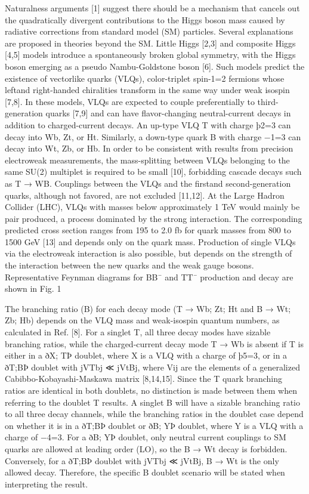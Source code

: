 Naturalness arguments [1] suggest there
should be a mechanism that cancels out the quadratically
divergent contributions to the Higgs boson mass caused by
radiative corrections from standard model (SM) particles.
Several explanations are proposed in theories beyond the
SM. Little Higgs [2,3] and composite Higgs [4,5] models
introduce a spontaneously broken global symmetry, with
the Higgs boson emerging as a pseudo Nambu-Goldstone
boson [6]. Such models predict the existence of vectorlike
quarks (VLQs), color-triplet spin-1=2 fermions whose leftand right-handed chiralities transform in the same way
under weak isospin [7,8]. In these models, VLQs are
expected to couple preferentially to third-generation quarks
[7,9] and can have flavor-changing neutral-current decays
in addition to charged-current decays. An up-type VLQ T
with charge þ2=3 can decay into Wb, Zt, or Ht. Similarly,
a down-type quark B with charge −1=3 can decay into Wt,
Zb, or Hb. In order to be consistent with results from
precision electroweak measurements, the mass-splitting
between VLQs belonging to the same SU(2) multiplet is
required to be small [10], forbidding cascade decays such
as T → WB. Couplings between the VLQs and the firstand second-generation quarks, although not favored, are
not excluded [11,12].
At the Large Hadron Collider (LHC), VLQs with masses
below approximately 1 TeV would mainly be pair produced, a process dominated by the strong interaction. The
corresponding predicted cross section ranges from 195
to 2.0 fb for quark masses from 800 to 1500 GeV [13]
and depends only on the quark mass. Production of single
VLQs via the electroweak interaction is also possible,
but depends on the strength of the interaction between
the new quarks and the weak gauge bosons. Representative
Feynman diagrams for BB¯ and TT¯ production and decay are shown in Fig. 1

The branching ratio (B) for each decay mode
(T → Wb; Zt; Ht and B → Wt; Zb; Hb) depends on the
VLQ mass and weak-isospin quantum numbers, as calculated in Ref. [8]. For a singlet T, all three decay modes have
sizable branching ratios, while the charged-current decay
mode T → Wb is absent if T is either in a ðX; TÞ doublet,
where X is a VLQ with a charge of þ5=3, or in a ðT;BÞ
doublet with jVTbj ≪ jVtBj, where Vij are the elements
of a generalized Cabibbo-Kobayashi-Maskawa matrix
[8,14,15]. Since the T quark branching ratios are identical
in both doublets, no distinction is made between them when
referring to the doublet T results. A singlet B will have a
sizable branching ratio to all three decay channels, while
the branching ratios in the doublet case depend on whether
it is in a ðT;BÞ doublet or ðB; YÞ doublet, where Y is a VLQ
with a charge of −4=3. For a ðB; YÞ doublet, only neutral
current couplings to SM quarks are allowed at leading order
(LO), so the B → Wt decay is forbidden. Conversely, for a
ðT;BÞ doublet with jVTbj ≪ jVtBj, B → Wt is the only
allowed decay. Therefore, the specific B doublet scenario
will be stated when interpreting the result.



